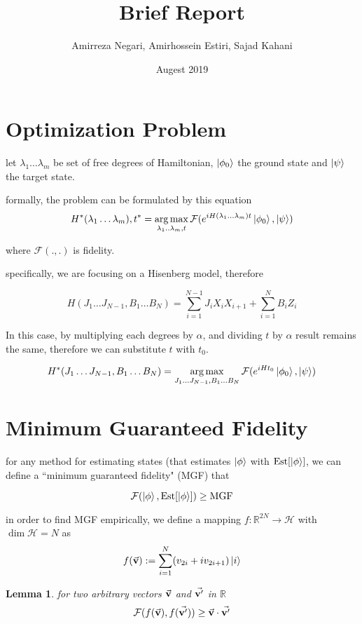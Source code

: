 \documentclass{article}
\title{Brief Report}
\author{Amirreza Negari, Amirhossein Estiri, Sajad Kahani}
\date{Augest 2019}
\DeclareMathOperator*{\argmax}{arg\,max}
\DeclareMathOperator*{\est}{Est}
\begin{document}
\maketitle

\section{Optimization Problem}
let ${\lambda_1\dots\lambda_m}$ be set of free degrees of Hamiltonian, $\ket{\phi_0}$ the ground state and $\ket{\psi}$ the target state.

formally, the problem can be formulated by this equation
\[ H^*(\lambda_1\dots\lambda_m), t^* = \argmax_{\lambda_1..\lambda_m, t} \mathcal{F}(e^{iH(\lambda_1\dots\lambda_m)t} \ket{\phi_0}, \ket{\psi}) \]

where $\mathcal{F}(., .)$ is fidelity.

specifically, we are focusing on a Hisenberg model, therefore

\[ H(J_1\dots J_{N-1}, B_1\dots B_N) = \sum_{i=1}^{N-1} J_i X_i X_{i+1} + \sum_{i=1}^N B_i Z_i\]

In this case, by multiplying each degrees by $\alpha$, and dividing $t$ by $\alpha$ result remains the same, therefore we can substitute $t$ with $t_0$.

\begin{equation} 
\label{eq:opt}
H^*(J_1\dots J_{N-1}, B_1\dots B_N) = \argmax_{J_1\dots J_{N-1}, B_1\dots B_N} \mathcal{F}(e^{iHt_0} \ket{\phi_0}, \ket{\psi})
\end{equation}


\section{Minimum Guaranteed Fidelity}

for any method for estimating states (that estimates $\ket{\phi}$ with $\est[\ket{\phi}]$, we can define a ``minimum guaranteed fidelity" (MGF) that

\[ \mathcal{F}(\ket{\phi}, \est[\ket{\phi}]) \ge \text{MGF} \]

in order to find MGF empirically, 
we define a mapping $f: \mathbb{R}^{2N} \rightarrow \mathcal{H}$ with $\dim \mathcal{H} = N$ as 
\[ f(\va{v}) := \sum_{i=1}^N (v_{2i} + iv_{2i+1}) \ket{i}\]

\newtheorem{lemma}{Lemma}
\begin{lemma}
for two arbitrary vectors $\va{v}$ and $\va{v'}$ in $\mathbb{R}$
\[ \mathcal{F}(f(\va{v}), f(\va{v'})) \ge \va{v}\cdot\va{v'} \]
\end{lemma}
\end{document}
